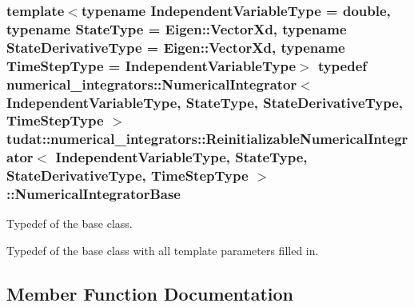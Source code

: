 \subsubsection[{\texorpdfstring{Numerical\+Integrator\+Base}{NumericalIntegratorBase}}]{\setlength{\rightskip}{0pt plus 5cm}template$<$typename Independent\+Variable\+Type  = double, typename State\+Type  = Eigen\+::\+Vector\+Xd, typename State\+Derivative\+Type  = Eigen\+::\+Vector\+Xd, typename Time\+Step\+Type  = Independent\+Variable\+Type$>$ typedef {\bf numerical\+\_\+integrators\+::\+Numerical\+Integrator}$<$ Independent\+Variable\+Type, State\+Type, State\+Derivative\+Type, Time\+Step\+Type $>$ {\bf tudat\+::numerical\+\_\+integrators\+::\+Reinitializable\+Numerical\+Integrator}$<$ Independent\+Variable\+Type, State\+Type, State\+Derivative\+Type, Time\+Step\+Type $>$\+::{\bf Numerical\+Integrator\+Base}\hspace{0.3cm}{\ttfamily [protected]}}\hypertarget{classtudat_1_1numerical__integrators_1_1ReinitializableNumericalIntegrator_a156664f177b4a65af665415ed5b7f9e2}{}\label{classtudat_1_1numerical__integrators_1_1ReinitializableNumericalIntegrator_a156664f177b4a65af665415ed5b7f9e2}


Typedef of the base class. 

Typedef of the base class with all template parameters filled in. 

\subsection{Member Function Documentation}
